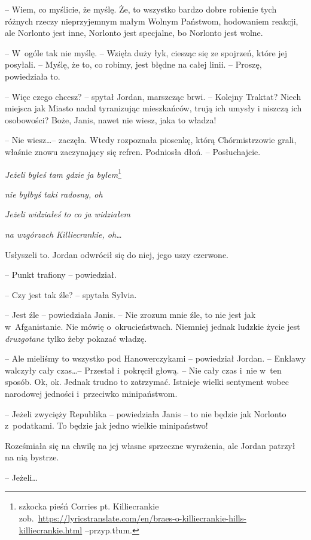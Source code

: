 \documentclass[oneside,polish,11pt,sfheadings]{mwbk}
\begin{document}
-- Wiem, co myślicie, że myślę. Że, to wszystko bardzo dobre robienie
tych różnych rzeczy nieprzyjemnym małym Wolnym Państwom, hodowaniem
reakcji, ale Norlonto jest inne, Norlonto jest specjalne, bo Norlonto
jest wolne.

-- W~ogóle tak nie myślę. -- Wzięła duży łyk, ciesząc się ze spojrzeń,
które jej posyłali. -- Myślę, że to, co robimy, jest błędne na całej
linii. -- Proszę, powiedziała to.

-- Więc czego chcesz? -- spytał Jordan, marszcząc brwi. -- Kolejny Traktat?
Niech miejsca jak Miasto nadal tyranizując mieszkańców, trują ich umysły
i niszczą ich osobowości? Boże, Janis, nawet nie wiesz, jaka to władza!

-- Nie wiesz\ldots -- zaczęła. Wtedy rozpoznała piosenkę, którą
Chórmistrzowie grali, właśnie znowu zaczynający się refren. Podniosła
dłoń. -- Posłuchajcie.

\emph{Jeżeli byłeś tam gdzie ja byłem}\footnote{szkocka pieśń Corries pt.
Killiecrankie
zob.~\url{https://lyricstranslate.com/en/braes-o-killiecrankie-hills-killiecrankie.html} --przyp.tłum.}

\emph{nie byłbyś taki radosny, oh}

\emph{Jeżeli widziałeś to co ja widziałem}

\emph{na wzgórzach Killiecrankie, oh\ldots  }

Usłyszeli to. Jordan odwrócił się do niej, jego uszy czerwone.

-- Punkt trafiony -- powiedział.

-- Czy jest tak źle? -- spytała Sylvia.

-- Jest źle -- powiedziała Janis. -- Nie zrozum mnie źle, to nie jest jak w~Afganistanie. Nie mówię o~okrucieństwach. Niemniej jednak ludzkie życie
jest \emph{druzgotane} tylko żeby pokazać władzę.

-- Ale mieliśmy to wszystko pod Hanowerczykami -- powiedział Jordan. -- Enklawy walczyły cały czas\ldots -- Przestał i~pokręcił głową. -- Nie cały
czas i~nie w~ten sposób. Ok, ok. Jednak trudno to zatrzymać. Istnieje
wielki sentyment wobec narodowej jedności i~przeciwko minipaństwom.

-- Jeżeli zwycięży Republika -- powiedziała Janis -- to nie będzie jak
Norlonto z~podatkami. To będzie jak jedno wielkie minipaństwo!

Roześmiała się na chwilę na jej własne sprzeczne wyrażenia, ale Jordan
patrzył na nią bystrze.

-- Jeżeli\ldots
\end{document}
